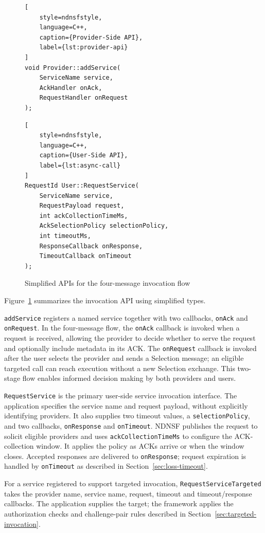 \begin{figure}[]
\centering

\begin{lstlisting}[
    style=ndnsfstyle,
    language=C++,
    caption={Provider-Side API},
    label={lst:provider-api}
]
void Provider::addService(
    ServiceName service,
    AckHandler onAck,
    RequestHandler onRequest
);
\end{lstlisting}

\vspace{4mm} %

\begin{lstlisting}[
    style=ndnsfstyle,
    language=C++,
    caption={User-Side API},
    label={lst:async-call}
]
RequestId User::RequestService(
    ServiceName service,
    RequestPayload request,
    int ackCollectionTimeMs,
    AckSelectionPolicy selectionPolicy,
    int timeoutMs,
    ResponseCallback onResponse,
    TimeoutCallback onTimeout
);
\end{lstlisting}

\caption{Simplified APIs for the four-message invocation flow}
\label{fig:ndnsf-apis}
\end{figure}

Figure~\ref{fig:ndnsf-apis} summarizes the invocation API using simplified types.

\texttt{addService} registers a named service together with two callbacks, \texttt{onAck} and \texttt{onRequest}. In the four-message flow, the \texttt{onAck} callback is invoked when a request is received, allowing the provider to decide whether to serve the request and optionally include metadata in its ACK. The \texttt{onRequest} callback is invoked after the user selects the provider and sends a Selection message; an eligible targeted call can reach execution without a new Selection exchange. This two-stage flow enables informed decision making by both providers and users.

\texttt{RequestService} is the primary user-side service invocation interface. The application specifies the service name and request payload, without explicitly identifying providers. It also supplies two timeout values, a \texttt{selectionPolicy}, and two callbacks, \texttt{onResponse} and \texttt{onTimeout}. NDNSF publishes the request to solicit eligible providers and uses \texttt{ackCollectionTimeMs} to configure the ACK-collection window. It applies the policy as ACKs arrive or when the window closes. Accepted responses are delivered to \texttt{onResponse}; request expiration is handled by \texttt{onTimeout} as described in Section~\ref{sec:loss-timeout}.

For a service registered to support targeted invocation, \texttt{RequestServiceTargeted} takes the provider name, service name, request, timeout and timeout/response callbacks. The application supplies the target; the framework applies the authorization checks and challenge-pair rules described in Section~\ref{sec:targeted-invocation}.
